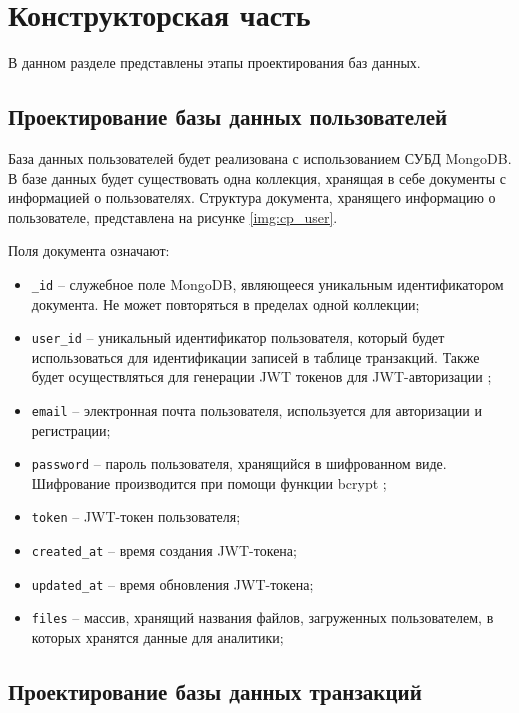 \chapter{Конструкторская часть}

В данном разделе представлены этапы проектирования баз данных.

\section{Проектирование базы данных пользователей}

База данных пользователей будет реализована с использованием СУБД MongoDB. В базе данных будет существовать одна коллекция, хранящая в себе документы с информацией о пользователях. Структура документа, хранящего информацию о пользователе, представлена на рисунке \ref{img:cp_user}.


Поля документа означают:

\begin{itemize}
	\item \texttt{\_id} -- служебное поле MongoDB, являющееся уникальным идентификатором документа. Не может повторяться в пределах одной коллекции;
	\item \texttt{user\_id} -- уникальный идентификатор пользователя, который будет использоваться для идентификации записей в таблице транзакций. Также будет осуществляться для генерации JWT токенов для JWT-авторизации \cite{jwt};
	\item \texttt{email} -- электронная почта пользователя, используется для авторизации и регистрации;
	\item \texttt{password} -- пароль пользователя, хранящийся в шифрованном виде. Шифрование производится при помощи функции bcrypt \cite{bcrypt};
	\item \texttt{token} -- JWT-токен пользователя;
	\item \texttt{created\_at} -- время создания JWT-токена;
	\item \texttt{updated\_at} -- время обновления JWT-токена;
	\item \texttt{files} -- массив, хранящий названия файлов, загруженных пользователем, в которых хранятся данные для аналитики;
\end{itemize}

\section{Проектирование базы данных транзакций}

